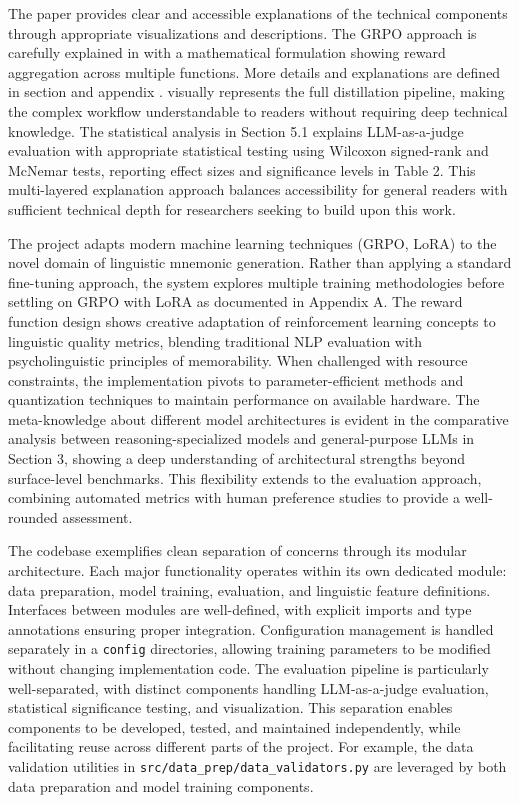  The paper provides clear and accessible explanations of the technical components through appropriate visualizations and descriptions. The GRPO approach is carefully explained in  with a mathematical formulation showing reward aggregation across multiple functions. More details and explanations are defined in section  and appendix .  visually represents the full distillation pipeline, making the complex workflow understandable to readers without requiring deep technical knowledge. The statistical analysis in Section 5.1 explains LLM-as-a-judge evaluation with appropriate statistical testing using Wilcoxon signed-rank and McNemar tests, reporting effect sizes and significance levels in Table 2. This multi-layered explanation approach balances accessibility for general readers with sufficient technical depth for researchers seeking to build upon this work.

 The project adapts modern machine learning techniques (GRPO, LoRA) to the novel domain of linguistic mnemonic generation. Rather than applying a standard fine-tuning approach, the system explores multiple training methodologies before settling on GRPO with LoRA as documented in Appendix A. The reward function design shows creative adaptation of reinforcement learning concepts to linguistic quality metrics, blending traditional NLP evaluation with psycholinguistic principles of memorability. When challenged with resource constraints, the implementation pivots to parameter-efficient methods and quantization techniques to maintain performance on available hardware. The meta-knowledge about different model architectures is evident in the comparative analysis between reasoning-specialized models and general-purpose LLMs in Section 3, showing a deep understanding of architectural strengths beyond surface-level benchmarks. This flexibility extends to the evaluation approach, combining automated metrics with human preference studies to provide a well-rounded assessment.

 The codebase exemplifies clean separation of concerns through its modular architecture. Each major functionality operates within its own dedicated module: data preparation, model training, evaluation, and linguistic feature definitions. Interfaces between modules are well-defined, with explicit imports and type annotations ensuring proper integration. Configuration management is handled separately in a \verb|config| directories, allowing training parameters to be modified without changing implementation code. The evaluation pipeline is particularly well-separated, with distinct components handling LLM-as-a-judge evaluation, statistical significance testing, and visualization. This separation enables components to be developed, tested, and maintained independently, while facilitating reuse across different parts of the project. For example, the data validation utilities in \verb|src/data_prep/data_validators.py| are leveraged by both data preparation and model training components.

